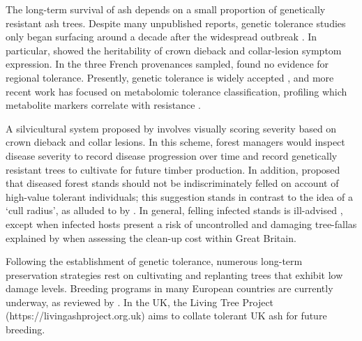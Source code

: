 The long-term survival of ash depends on a small proportion of genetically resistant ash trees.
Despite many unpublished reports, genetic tolerance studies only began surfacing around a decade
after the widespread outbreak \cite{kjaer2012adaptive, stener2013clonal, mckinney2014ash}.
In particular, \cite{doi:10.1094/PHYTO-11-15-0284-R} showed the heritability of crown dieback and
collar-lesion symptom expression. In the three French provenances sampled,
\cite{doi:10.1094/PHYTO-11-15-0284-R} found no evidence for regional tolerance.
Presently, genetic tolerance is widely accepted \cite{havrdova2016differences, skovsgaard2017silvicultural},
and more recent work has focused on metabolomic tolerance classification,
profiling which metabolite markers correlate with resistance 
\cite{nemesio2020canditate, nemesio2020metabolomics, sidda2020diversity, chaudhary2020identification}.

A silvicultural system proposed by \cite{skovsgaard2017silvicultural} involves visually scoring severity based on crown dieback
and collar lesions. In this scheme, forest managers would inspect disease severity to record disease progression over time
and record genetically resistant trees to cultivate for future timber production. In addition, 
\cite{skovsgaard2017silvicultural} proposed that diseased forest stands should not be indiscriminately felled on account of high-value
tolerant individuals; this suggestion stands in contrast to the idea of a `cull radius', as alluded to by \cite{WEBIDEMICS}. 
In general, felling infected stands is ill-advised  \cite{chandelier2017ash}, except when infected hosts present a risk of uncontrolled 
and damaging tree-fall\textemdash as explained by \cite{ash-dieback-costs} when assessing the clean-up cost within Great Britain.

Following the establishment of genetic tolerance, numerous long-term preservation strategies 
rest on cultivating and replanting trees that exhibit low damage levels. Breeding 
programs in many European countries are currently underway, as reviewed by \cite{https://doi.org/10.1002/ppp3.10060}.
In the UK, the Living Tree Project (https://livingashproject.org.uk) aims to collate tolerant UK ash for future breeding.


